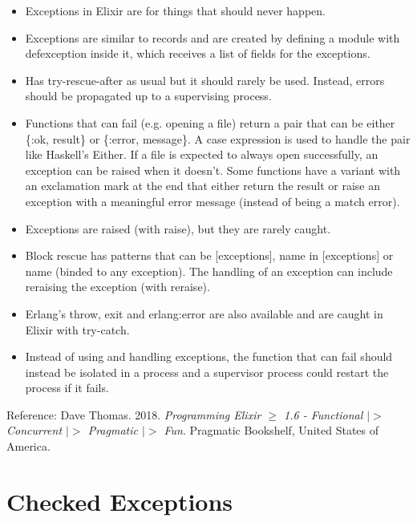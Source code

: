 \documentclass[a4paper,11pt]{article}
\theoremstyle{plain}
\theoremstyle{nonumberplain}
\begin{document}
\begin{itemize}
  \item Exceptions in Elixir are for things that should never happen.
  \item Exceptions are similar to records and are created by defining a module with defexception inside it, which receives a list of fields for the exceptions.
  \item Has try-rescue-after as usual but it should rarely be used. Instead, errors should be propagated up to a supervising process.
  \item Functions that can fail (e.g. opening a file) return a pair that can be either \{:ok, result\} or \{:error, message\}. A case expression is used to handle the pair like Haskell's Either. If a file is expected to always open successfully, an exception can be raised when it doesn't. Some functions have a variant with an exclamation mark at the end that either return the result or raise an exception with a meaningful error message (instead of being a match error).
  \item Exceptions are raised (with raise), but they are rarely caught.
  \item Block rescue has patterns that can be [exceptions], name in [exceptions] or name (binded to any exception). The handling of an exception can include reraising the exception (with reraise).
  \item Erlang's throw, exit and erlang:error are also available and are caught in Elixir with try-catch.
  \item Instead of using and handling exceptions, the function that can fail should instead be isolated in a process and a supervisor process could restart the process if it fails.
\end{itemize}

Reference: Dave Thomas. 2018. \textit{Programming Elixir $\ge$ 1.6 - Functional $|\!\!>$ Concurrent $|\!\!>$ Pragmatic $|\!\!>$ Fun}. Pragmatic Bookshelf, United States of America.

\section{Checked Exceptions}
\end{document}
